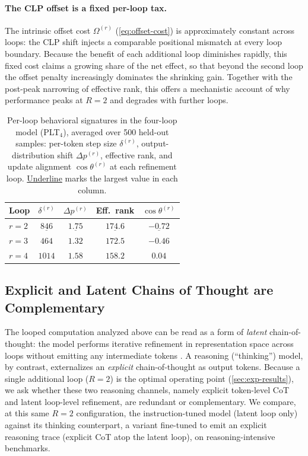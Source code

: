 \documentclass{llmxive}
\providecommand{\loopcount}{R}
\begin{document}
\paragraph{The CLP offset is a fixed per-loop tax.}
The intrinsic offset cost $\Omega^{(r)}$ (\autoref{eq:offset-cost}) is
approximately constant across loops: the CLP shift injects a comparable
positional mismatch at every loop boundary.
Because the benefit of each additional loop diminishes rapidly, this fixed cost
claims a growing share of the net effect, so that beyond the second loop the
offset penalty increasingly dominates the shrinking gain.
Together with the post-peak narrowing of effective rank, this offers a
mechanistic account of why performance peaks at $\loopcount=2$ and degrades
with further loops.

\begin{table}[!htbp]
\centering
\begin{tabular}{lcccc}
\toprule
\textbf{Loop} & $\delta^{(r)}$ & $\Delta p^{(r)}$ & \textbf{Eff.\ rank} & $\cos\theta^{(r)}$ \\
\midrule
$r=2$ & $\underline{846}$            & $\underline{1.75}$  & $\underline{174.6}$ & $\underline{-0.72}$ \\
$r=3$ & $464$            & $1.32$              & $172.5$             & $-0.46$ \\
$r=4$ & $1014$ & $1.58$            & $158.2$             & $0.04$ \\
\bottomrule
\end{tabular}
\caption{Per-loop behavioral signatures in the four-loop model (PLT$_4$),
averaged over 500 held-out samples: per-token step size $\delta^{(r)}$,
output-distribution shift $\Delta p^{(r)}$, effective rank, and update
alignment $\cos\theta^{(r)}$ at each refinement loop. \underline{Underline}
marks the largest value in each column.}
\label{tab:behavior-summary}
\end{table}

\subsection{Explicit and Latent Chains of Thought are Complementary}
\label{sec:analysis-cot}

The looped computation analyzed above can be read as a form of \emph{latent}
chain-of-thought: the model performs iterative refinement in representation
space across loops without emitting any intermediate tokens
\citep{geiping2025scaling,lu2025latent}.
A reasoning (``thinking'') model, by contrast, externalizes an \emph{explicit}
chain-of-thought as output tokens.
Because a single additional loop ($\loopcount = 2$) is the optimal operating
point (\autoref{sec:exp-results}), we ask whether these two reasoning
channels, namely explicit token-level CoT and latent loop-level refinement,
are redundant or complementary.
We compare, at this same $\loopcount = 2$ configuration, the instruction-tuned
model (latent loop only) against its thinking counterpart, a variant fine-tuned
to emit an explicit reasoning trace (explicit CoT atop the latent loop), on
reasoning-intensive benchmarks.
\end{document}
